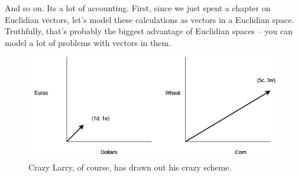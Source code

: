 \documentclass[
]{book}
\begin{document}
And so on. Its a lot of accounting. First, since we just spent a chapter on Euclidian vectors, let's model these calculations as vectors in a Euclidian space. Truthfully, that's probably the biggest advantage of Euclidian spaces -- you can model a lot of problems with vectors in them.

\begin{figure}

{\centering \includegraphics[width=0.75\linewidth,height=0.75\textheight]{images/CrazyCornWheat} 

}

\caption{Crazy Larry, of course, has drawn out his crazy scheme.}\label{fig:unnamed-chunk-17}
\end{figure}

  
\end{document}

